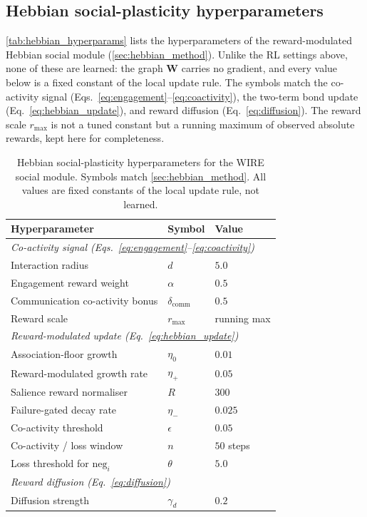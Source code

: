 \subsection{Hebbian social-plasticity hyperparameters}
\label{sec:hebbian_hyperparams}

\autoref{tab:hebbian_hyperparams} lists the hyperparameters of the reward-modulated Hebbian social module (\autoref{sec:hebbian_method}). Unlike the RL settings above, none of these are learned: the graph $\mathbf{W}$ carries no gradient, and every value below is a fixed constant of the local update rule. The symbols match the co-activity signal (Eqs.~\eqref{eq:engagement}--\eqref{eq:coactivity}), the two-term bond update (Eq.~\eqref{eq:hebbian_update}), and reward diffusion (Eq.~\eqref{eq:diffusion}). The reward scale $r_{\max}$ is not a tuned constant but a running maximum of observed absolute rewards, kept here for completeness.

\begin{table}[h]
\centering
\caption{Hebbian social-plasticity hyperparameters for the WIRE social module. Symbols match \autoref{sec:hebbian_method}. All values are fixed constants of the local update rule, not learned.}
\label{tab:hebbian_hyperparams}
\small
\begin{tabular}{lll}
\toprule
Hyperparameter & Symbol & Value \\
\midrule
\multicolumn{3}{l}{\emph{Co-activity signal (Eqs.~\ref{eq:engagement}--\ref{eq:coactivity})}} \\
Interaction radius                & $d$                    & $5.0$ \\
Engagement reward weight          & $\alpha$               & $0.5$ \\
Communication co-activity bonus   & $\delta_{\text{comm}}$ & $0.5$ \\
Reward scale                      & $r_{\max}$             & running max \\
\midrule
\multicolumn{3}{l}{\emph{Reward-modulated update (Eq.~\ref{eq:hebbian_update})}} \\
Association-floor growth          & $\eta_0$               & $0.01$ \\
Reward-modulated growth rate      & $\eta_+$               & $0.05$ \\
Salience reward normaliser        & $R$                    & $300$ \\
Failure-gated decay rate          & $\eta_-$               & $0.025$ \\
Co-activity threshold             & $\epsilon$             & $0.05$ \\
Co-activity / loss window         & $n$                    & $50$ steps \\
Loss threshold for $\mathrm{neg}_i$ & $\theta$             & $5.0$ \\
\midrule
\multicolumn{3}{l}{\emph{Reward diffusion (Eq.~\ref{eq:diffusion})}} \\
Diffusion strength                & $\gamma_d$             & $0.2$ \\
\bottomrule
\end{tabular}
\end{table}

